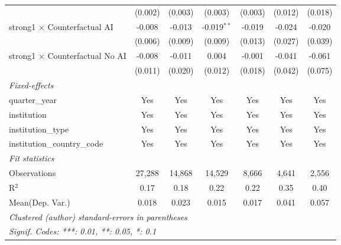 \begin{tabular}{lcccccc}
                                          & (0.002)       & (0.003)       & (0.003)       & (0.003)  & (0.012)     & (0.018)\\   
   strong1 $\times$ Counterfactual AI     & -0.008        & -0.013        & -0.019$^{**}$ & -0.019   & -0.024      & -0.020\\   
                                          & (0.006)       & (0.009)       & (0.009)       & (0.013)  & (0.027)     & (0.039)\\   
   strong1 $\times$ Counterfactual No AI  & -0.008        & -0.011        & 0.004         & -0.001   & -0.041      & -0.061\\   
                                          & (0.011)       & (0.020)       & (0.012)       & (0.018)  & (0.042)     & (0.075)\\   
   \midrule
   \emph{Fixed-effects}\\
   quarter\_year                          & Yes           & Yes           & Yes           & Yes      & Yes         & Yes\\  
   institution                            & Yes           & Yes           & Yes           & Yes      & Yes         & Yes\\  
   institution\_type                      & Yes           & Yes           & Yes           & Yes      & Yes         & Yes\\  
   institution\_country\_code             & Yes           & Yes           & Yes           & Yes      & Yes         & Yes\\  
   \midrule
   \emph{Fit statistics}\\
   Observations                           & 27,288        & 14,868        & 14,529        & 8,666    & 4,641       & 2,556\\  
   R$^2$                                  & 0.17          & 0.18          & 0.22          & 0.22     & 0.35        & 0.40\\  
Mean(Dep. Var.) & 0.018 & 0.023 & 0.015 & 0.017 & 0.041 & 0.057 \\
   \midrule \midrule
   \multicolumn{7}{l}{\emph{Clustered (author) standard-errors in parentheses}}\\
   \multicolumn{7}{l}{\emph{Signif. Codes: ***: 0.01, **: 0.05, *: 0.1}}\\
\end{tabular}
\par\endgroup
